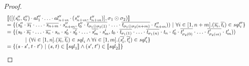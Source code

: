 \documentclass[acmsmall]{acmart}
\begin{document}
\begin{proof}
  \[
    \begin{array}{l}
      \SemanticsOf{(\SequenceLensOf{(\String_0'',\StringAlt_0'') \SeqLSep
      \AtomLens_1'' \SeqLSep
      \ldots \SeqLSep
      \AtomLens_{n+m}'' \SeqLSep (\String_{n+m}'',\StringAlt_{n+m}'')},
      \ConcatPermutationOf{\sigma_1}{\sigma_2})}\\
      = \SetOf{(\String_0''\Concat\overline{\String_1}\Concat
      \ldots\Concat\overline{\String_{n+m}}\Concat\String_{n+m}'',
      \StringAlt_0''\Concat\overline{\StringAlt_{\ConcatPermutationOf{\sigma_1}{\sigma_2}(1)}}\Concat
      \ldots\Concat\overline{\StringAlt_{\ConcatPermutationOf{\sigma_1}{\sigma_2}(n+m)}}\Concat\StringAlt_{n+m}''))\SuchThat
      \forall i\in\RangeIncInc{1}{n+m}.(\overline{\String_i},\overline{\StringAlt_i})\in\SequenceLens_i''}\\
      = \SetOf{(\String_0\Concat\overline{\String_1}\Concat\ldots\Concat
      \overline{\String_n}\Concat\String_n\Concat\String_0'\Concat\overline{\String_{0}'}\Concat
      \ldots\Concat\overline{\String_m'}\Concat\String_m',
      \StringAlt_0\Concat\overline{\StringAlt_{\sigma_1(1)}}\Concat\ldots\Concat
      \overline{\StringAlt_{\sigma_1(n)}}\Concat\StringAlt_n\Concat\StringAlt_0'
      \Concat\overline{\StringAlt_{\sigma_2(0)}'}\Concat
      \ldots\Concat\overline{\StringAlt_{\sigma_2(m)}'}\Concat\StringAlt_m'))\\
      \hspace*{3em}\SuchThat
      (\forall i\in\RangeIncInc{1}{n}.
      (\overline{\String_i},\overline{\StringAlt_i})\in\SequenceLens_i
      \BooleanAnd
      \forall i\in\RangeIncInc{1}{m}.
      (\overline{\String_i'},\overline{\StringAlt_i'})\in\SequenceLens_i'}\\
      = \SetOf{(\String\Concat\String',\StringAlt\Concat\StringAlt')\SuchThat
      (\String,\StringAlt)\in\SemanticsOf{\SequenceLens_1}
      \BooleanAnd
      (\String',\StringAlt')\in\SemanticsOf{\SequenceLens_2}}
    \end{array}
  \]

\end{proof}
\end{document}
